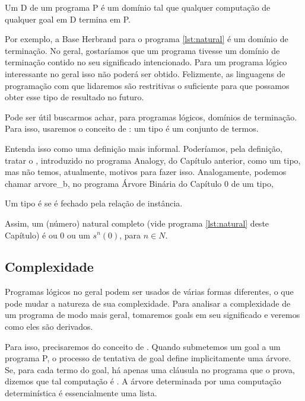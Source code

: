 \documentclass{article}
\begin{document}
\begin{definition}
  Um  D de um programa P é um domínio
  tal que qualquer computação de qualquer goal em D termina em P.
\end{definition}

Por exemplo, a Base Herbrand para o programa \ref{lst:natural} é um
domínio de terminação.  No geral, gostaríamos que um programa tivesse
um domínio de terminação contido no seu significado intencionado. Para
um programa lógico interessante no geral isso não poderá ser
obtido. Felizmente, as linguagens de programação com que lidaremos são
restritivas o suficiente para que possamos obter esse tipo de
resultado no futuro.

Pode ser útil buscarmos achar, para programas lógicos, domínios de
terminação. Para isso, usaremos o conceito de : um tipo
é um conjunto de termos.

Entenda isso como uma definição mais informal. Poderíamos, pela
definição, tratar o , introduzido no programa Analogy,
do Capítulo anterior, como um tipo, mas não temos, atualmente, motivos
para fazer isso.  Analogamente, podemos chamar arvore\_b, no programa
Árvore Binária do Capítulo 0 de um tipo, %

\begin{definition}
  Um tipo é  se é fechado pela relação de instância.
\end{definition}

Assim, um (número) natural completo (vide programa \ref{lst:natural}
deste Capítulo) é ou 0 ou um $s^n(0)$, para $n \in N$.

\subsection{Complexidade}

Programas lógicos no geral podem ser usados de várias formas
diferentes, o que pode mudar a natureza de sua complexidade. Para
analisar a complexidade de um programa de modo mais geral, tomaremos
goals em seu significado e veremos como eles são derivados.

Para isso, precisaremos do conceito de . Quando submetemos um goal a um programa P, o processo de
tentativa de goal define implicitamente uma árvore. Se, para cada
termo do goal, há apenas uma cláusula no programa que o prova, dizemos
que tal computação é . A árvore determinada
por uma computação determinística é essencialmente uma lista.
\end{document}
